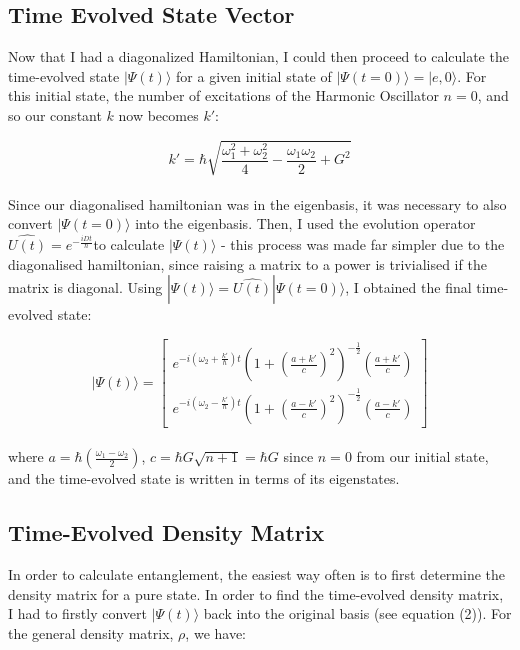 \documentclass[12pt,a4paper]{article}
\begin{document}
\subsection{\normalsize{Time Evolved State Vector}}

Now that I had a diagonalized Hamiltonian, I could then proceed to calculate the time-evolved state $|\Psi(t)\rangle$ for a given initial state of $|\Psi(t=0)\rangle = |e,0\rangle$. For this initial state, the number of excitations of the Harmonic Oscillator $n=0$, and so our constant $k$ now becomes $k'$:

\begin{equation*}
    k' = \hbar\sqrt{\frac{\omega_1^2 + \omega_2^2}{4}-\frac{\omega_1\omega_2}{2}+G^2}
\end{equation*}
\\
Since our diagonalised hamiltonian was in the eigenbasis, it was necessary to also convert $|\Psi(t=0)\rangle$ into the eigenbasis. Then, I used the evolution operator $\hat{U(t)} = e^{-\frac{iDt}{\hbar}}$to calculate $|\Psi(t)\rangle$ - this process was made far simpler due to the diagonalised hamiltonian, since raising a matrix to a power is trivialised if the matrix is diagonal. Using $|\Psi(t)\rangle = \hat{U(t)}|\Psi(t=0)\rangle$, I obtained the final time-evolved state:

\begin{equation}
    |\Psi(t)\rangle = \begin{bmatrix}
        e^{-i(\omega_2 + \frac{k'}{\hbar})t}(1+(\frac{a+k'}{c})^2)^{-\frac{1}{2}}(\frac{a+k'}{c}) \\
        e^{-i(\omega_2 - \frac{k'}{\hbar})t}(1+(\frac{a-k'}{c})^2)^{-\frac{1}{2}}(\frac{a-k'}{c})
    \end{bmatrix}
\end{equation}
\\
where $a = \hbar(\frac{\omega_1 - \omega_2}{2})$, $c = \hbar G\sqrt{n+1} = \hbar G$ since $n=0$ from our initial state, and the time-evolved state is written in terms of its eigenstates.
\\
\subsection{\normalsize{Time-Evolved Density Matrix}}

In order to calculate entanglement, the easiest way often is to first determine the density matrix for a pure state. In order to find the time-evolved density matrix, I had to firstly convert $|\Psi(t)\rangle$ back into the original basis (see equation (2)). For the general density matrix, $\rho$, we have:
\end{document}
